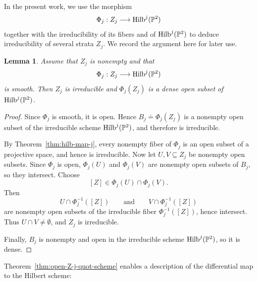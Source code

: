 \documentclass[11pt]{amsart} %
\newtheorem{Lemma}[Theorem]{Lemma}
\theoremstyle{definition}
\def\NZQ{\mathbb}               %
\def\PP{{\NZQ P}}
\def\Hilbert{{\rm Hilb}}
\begin{document}
In the present work, we use the morphism
\[
\Phi_j:Z_j\longrightarrow\Hilbert^j(\PP^2)
\]
together with the irreducibility of its fibers and of
$\Hilbert^j(\PP^2)$ to deduce irreducibility of several strata
$Z_j$. We record the argument here for later use.

\begin{Lemma}\label{lem:irreducibility-from-Hilbert-map}
Assume that $Z_j$ is nonempty and that
\[
\Phi_j:Z_j\longrightarrow\Hilbert^j(\PP^2)
\]
is smooth. Then $Z_j$ is irreducible and
$\Phi_j(Z_j)$ is a dense open subset of
$\Hilbert^j(\PP^2)$.
\end{Lemma}

\begin{proof}
Since $\Phi_j$ is smooth, it is open. Hence \(B_j\doteq\Phi_j(Z_j)
\) is a nonempty open subset of the irreducible scheme
$\Hilbert^j(\PP^2)$, and therefore is irreducible.

By Theorem~\ref{thm:hilb-map-j}, every nonempty fiber of $\Phi_j$
is an open subset of a projective space, and hence is irreducible.
Now let $U,V\subseteq Z_j$ be nonempty open subsets. Since $\Phi_j$
is open, $\Phi_j(U)$ and $\Phi_j(V)$ are nonempty open subsets of
$B_j$, so they intersect. Choose
\[
[Z]\in\Phi_j(U)\cap\Phi_j(V).
\]
Then
\[
U\cap\Phi_j^{-1}([Z])
\qquad\text{and}\qquad
V\cap\Phi_j^{-1}([Z])
\]
are nonempty open subsets of the irreducible fiber
$\Phi_j^{-1}([Z])$, hence intersect. Thus $U\cap V\neq\emptyset$,
and $Z_j$ is irreducible.

Finally, $B_j$ is nonempty and open in the irreducible scheme
$\Hilbert^j(\PP^2)$, so it is dense.
\end{proof}

Theorem~\ref{thm:open-Z-j-quot-scheme} enables a description of the differential map to the Hilbert scheme:
\end{document}
